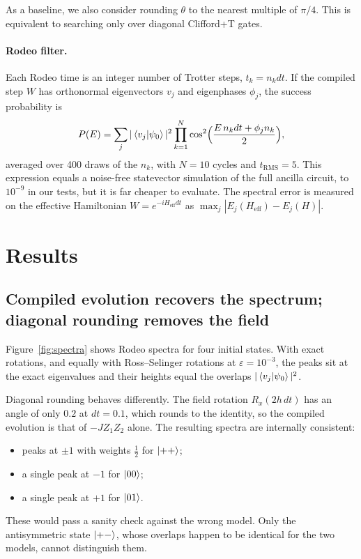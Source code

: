 \documentclass[10pt,a4paper]{article}
\begin{document}
As a baseline, we also consider rounding $\theta$ to the nearest multiple of $\pi/4$. This is equivalent to searching only over diagonal Clifford+T gates.

\paragraph{Rodeo filter.} Each Rodeo time is an integer number of Trotter steps, $t_k=n_kdt$. If the compiled step $W$ has orthonormal eigenvectors $v_j$ and eigenphases $\phi_j$, the success probability is
\[
P(E)=\sum_j |\braket{v_j|\psi_0}|^2\prod_{k=1}^{N}\cos^2\!\Big(\frac{E\,n_kdt+\phi_j n_k}{2}\Big),
\]
averaged over 400 draws of the $n_k$, with $N=10$ cycles and $t_\mathrm{RMS}=5$. This expression equals a noise-free statevector simulation of the full ancilla circuit, to $10^{-9}$ in our tests, but it is far cheaper to evaluate. The spectral error is measured on the effective Hamiltonian $W=e^{-iH_\mathrm{eff}dt}$ as $\max_j|E_j(H_\mathrm{eff})-E_j(H)|$.

\section{Results}
\subsection{Compiled evolution recovers the spectrum; diagonal rounding removes the field}
Figure~\ref{fig:spectra} shows Rodeo spectra for four initial states. With exact rotations, and equally with Ross--Selinger rotations at $\varepsilon=10^{-3}$, the peaks sit at the exact eigenvalues and their heights equal the overlaps $|\braket{v_j|\psi_0}|^2$.

Diagonal rounding behaves differently. The field rotation $R_x(2h\,dt)$ has an angle of only $0.2$ at $dt=0.1$, which rounds to the identity, so the compiled evolution is that of $-JZ_1Z_2$ alone. The resulting spectra are internally consistent:
\begin{itemize}
\item peaks at $\pm1$ with weights $\tfrac12$ for $\ket{++}$;
\item a single peak at $-1$ for $\ket{00}$;
\item a single peak at $+1$ for $\ket{01}$.
\end{itemize}
These would pass a sanity check against the wrong model. Only the antisymmetric state $\ket{+-}$, whose overlaps happen to be identical for the two models, cannot distinguish them.
\end{document}
